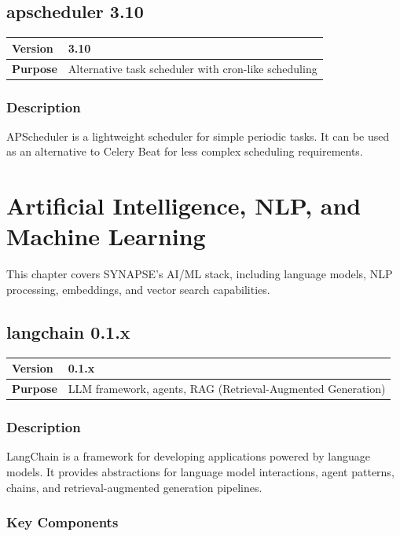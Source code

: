 \documentclass[12pt,a4paper]{report}
\begin{document}
\section{apscheduler 3.10}

\begin{tabular}{|p{4cm}|p{10cm}|}
\hline
\textbf{Version} & 3.10 \\
\hline
\textbf{Purpose} & Alternative task scheduler with cron-like scheduling \\
\hline
\end{tabular}

\subsection{Description}

APScheduler is a lightweight scheduler for simple periodic tasks. It can be used as an alternative to Celery Beat for less complex scheduling requirements.

\chapter{Artificial Intelligence, NLP, and Machine Learning}

This chapter covers SYNAPSE's AI/ML stack, including language models, NLP processing, embeddings, and vector search capabilities.

\section{langchain 0.1.x}

\begin{tabular}{|p{4cm}|p{10cm}|}
\hline
\textbf{Version} & 0.1.x \\
\hline
\textbf{Purpose} & LLM framework, agents, RAG (Retrieval-Augmented Generation) \\
\hline
\end{tabular}

\subsection{Description}

LangChain is a framework for developing applications powered by language models. It provides abstractions for language model interactions, agent patterns, chains, and retrieval-augmented generation pipelines.

\subsection{Key Components}
\end{document}
